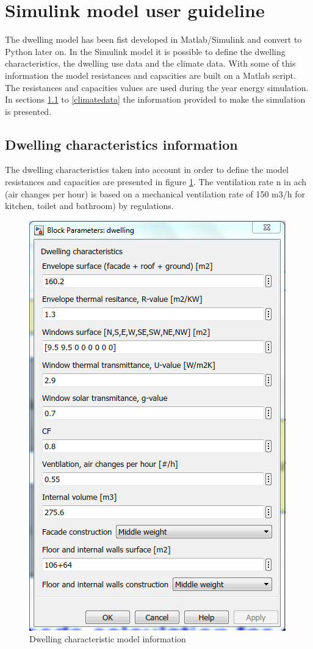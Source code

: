 \section{Simulink model user guideline}

The dwelling model has been fist developed in Matlab/Simulink and convert to Python later on. In the Simulink model it is possible to define the dwelling characteristics, the dwelling use data and the climate data. With some of this information the model resistances and capacities are built on a Matlab script. The resistances and capacities values are used during the year energy simulation. 
In sections \ref{Dewellinginfo} to \ref{climatedata} the information provided to make the simulation is presented.

\subsection{Dwelling characteristics information}
\label{Dewellinginfo}
	
The dwelling characteristics taken into account in order to define the model resistances and capacities are presented in figure \ref{figure: Dwelling characteristic}. The ventilation rate n in ach (air changes per hour) is based on a mechanical ventilation rate of 150 m3/h for kitchen, toilet and bathroom) by regulations.

\begin{figure}[H]
	\centering
	\includegraphics[width=0.8\columnwidth]{Pictures/dwelling characteristic model information.png}
	\caption[Short title]{Dwelling characteristic model information}
	\label{figure: Dwelling characteristic}
\end{figure}
\newpage
